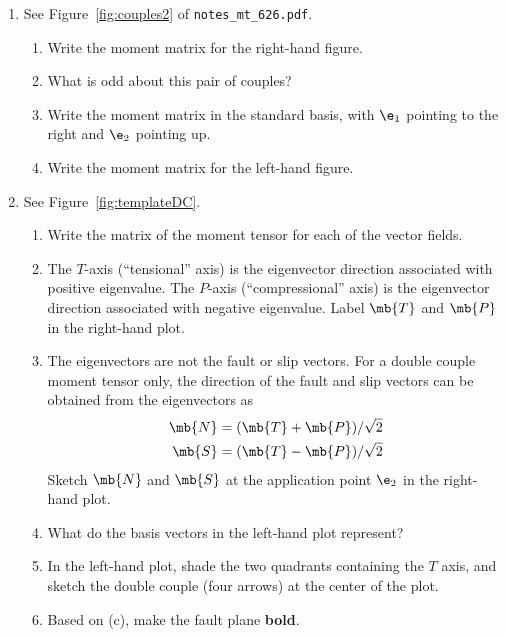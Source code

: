 \documentclass[11pt,titlepage,fleqn]{article}
\newcommand{\mtfile}{\texttt{notes\_mt\_626.pdf}}
\begin{document}
\begin{enumerate}
\begin{enumerate}
Draw the base of each vector at the tip of $\e_1$, $-\e_1$, $\e_2$, or $-\e_2$.

Here, draw all forces as unit vectors. 

\item Which entries of the matrix represent the classical description of the double couple?
(See ``Nomenclature confusion'' in \mtfile.)
\end{enumerate}


\item See Figure~\ref{fig:couples2} of \mtfile.
%
\begin{enumerate}
\item Write the moment matrix for the right-hand figure.
\item What is odd about this pair of couples?
\item Write the moment matrix in the standard basis, with $\e_1$ pointing to the right and $\e_2$ pointing up.
\item Write the moment matrix for the left-hand figure.
\end{enumerate}


\item See Figure~\ref{fig:templateDC}.
%
\begin{enumerate}
\item Write the matrix of the moment tensor for each of the vector fields.

\item The $T$-axis (``tensional'' axis) is the eigenvector direction associated with positive eigenvalue. The $P$-axis (``compressional'' axis) is the eigenvector direction associated with negative eigenvalue. Label $\mb{T}$ and $\mb{P}$ in the right-hand plot.

\item The eigenvectors are not the fault or slip vectors. For a double couple moment tensor only, the direction of the fault and slip vectors can be obtained from the eigenvectors as 
%
\begin{eqnarray*}
\mb{N} = (\mb{T} + \mb{P})/\sqrt{2}
\\
\mb{S} = (\mb{T} - \mb{P})/\sqrt{2}
\end{eqnarray*}
%
Sketch $\mb{N}$ and $\mb{S}$ at the application point $\e_2$ in the right-hand plot.
\item What do the basis vectors in the left-hand plot represent?
\item In the left-hand plot, shade the two quadrants containing the $T$ axis, and sketch the double couple (four arrows) at the center of the plot.
\item Based on (c), make the fault plane {\bf bold}.
\end{enumerate}


\end{enumerate}
\end{document}
